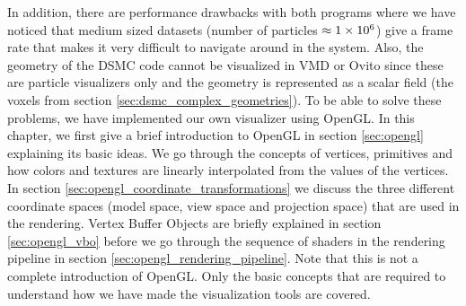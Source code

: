 In addition, there are performance drawbacks with both programs where we have noticed that medium sized datasets (number of particles $\approx 1\times 10^{6}$) give a frame rate that makes it very difficult to navigate around in the system. Also, the geometry of the DSMC code cannot be visualized in VMD or Ovito since these are particle visualizers only and the geometry is represented as a scalar field (the voxels from section \ref{sec:dsmc_complex_geometries}). To be able to solve these problems, we have implemented our own visualizer using OpenGL. In this chapter, we first give a brief introduction to OpenGL in section \ref{sec:opengl} explaining its basic ideas. We go through the concepts of vertices, primitives and how colors and textures are linearly interpolated from the values of the vertices. In section \ref{sec:opengl_coordinate_transformations} we discuss the three different coordinate spaces (model space, view space and projection space) that are used in the rendering. Vertex Buffer Objects are briefly explained in section \ref{sec:opengl_vbo} before we go through the sequence of shaders in the rendering pipeline in section \ref{sec:opengl_rendering_pipeline}. Note that this is not a complete introduction of OpenGL. Only the basic concepts that are required to understand how we have made the visualization tools are covered.